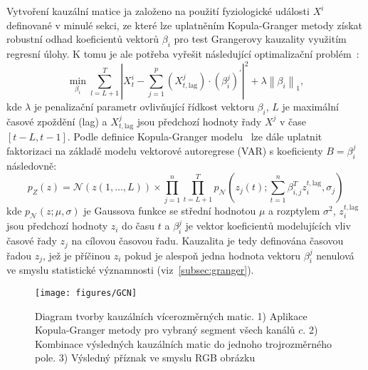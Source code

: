 Vytvoření kauzální matice ja založeno na použití fyziologické události $X^i$
definované v minulé sekci, ze které lze uplatněním Kopula-Granger metody získat
robustní odhad koeficientů vektorů $\beta_i$ pro test Grangerovy kauzality
využitím regresní úlohy. K tomu je ale potřeba vyřešit následující optimalizační
problém~\cite{Schindler2013,Guy2016}:
\begin{equation}
    \min _{\beta_i} \sum_{l=L+1}^T\left|X_t^i-\sum_{j=1}^p\left(X_{t, \text {lag}}^j\right) \cdot\left(\beta_i^j\right)^{\prime}\right|^2+\lambda\left\|\beta_i\right\|_1,
\end{equation}
kde $\lambda$ je penalizační parametr ovlivňující řídkost vektoru $\beta_i$, $L$
je maximální časové zpoždění (lag) a ${X}_{t, \text {lag}}^j$ jsou předchozí
hodnoty řady $X^j$ v čase $[t - L, t - 1]$. Podle definice Kopula-Granger
modelu~\cite{Schindler2013,Guy2016} lze dále uplatnit faktorizaci na základě
modelu vektorové autoregrese (\gls{VAR}) s koeficienty $B = {{\beta}_{i}^j}$
následovně:
\begin{equation}
    p_Z(z)=\mathcal{N}(z(1, \ldots, L)) \times \prod_{j=1}^n \prod_{t=L+1}^T p_{\mathcal{N}}\left(z_j(t) ; \sum_{t=1}^n \beta_{i, j}^T z_i^{t, \text {lag}}, \sigma_j\right)
\end{equation}
kde $p_{\mathcal{N}}(z ; \mu, \sigma)$ je Gaussova funkce se střední hodnotou
$\mu$ a rozptylem $\sigma^2$, $z_i^{t, \text {lag}}$ jsou předchozí hodnoty
$z_i$ do času $t$ a ${\beta}_{i}^j$ je vektor koeficientů modelujících vliv
časové řady $z_j$ na cílovou časovou řadu. Kauzalita je tedy definována časovou
řadou $z_j$, jež je příčinou $z_i$ pokud je alespoň jedna hodnota vektoru
${\beta}_{i}^j$ nenulová ve smyslu statistické významnosti
(viz~\ref{subsec:granger}).

\begin{figure}[h]
    \begin{center}
        \texttt{[image: figures/GCN]}
        \caption{Diagram tvorby kauzálních vícerozměrných matic. 1) Aplikace
            Kopula-Granger metody pro vybraný segment všech kanálů $c$. 2) Kombinace
            výsledných kauzálních matic do jednoho trojrozměrného pole. 3) Výsledný
            příznak ve smyslu RGB obrázku}
        \label{fig:GCN}
    \end{center}
\end{figure}

